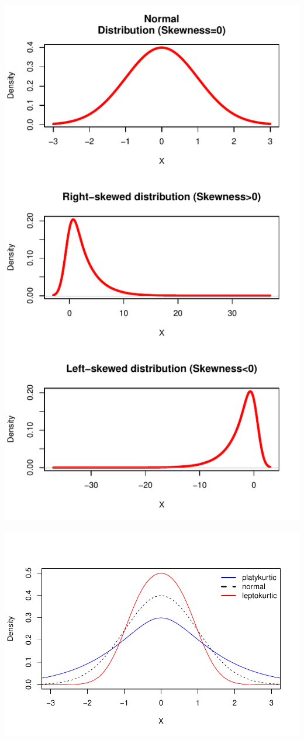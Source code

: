 \documentclass[]{book}
\theoremstyle{definition}
\theoremstyle{definition}
\theoremstyle{definition}
\theoremstyle{remark}
\begin{document}
\begin{center}\includegraphics{bookdown-demo_files/figure-latex/unnamed-chunk-53-1} \end{center}

\begin{center}\includegraphics{bookdown-demo_files/figure-latex/unnamed-chunk-54-1} \end{center}
\end{document}
